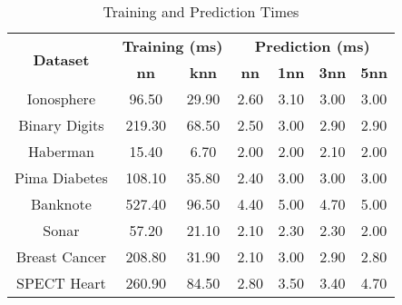 \begin{table}[htbp]
\caption{Training and Prediction Times}
\begin{center}
\begin{tabular}{|c|c|c|c|c|c|c|}
\hline
\multirow{2}{*}{\textbf{Dataset}} & \multicolumn{2}{c|}{\textbf{Training (ms)}} & \multicolumn{4}{c|}{\textbf{Prediction (ms)}} \\ \cline{2-7}
 & \textbf{nn} & \textbf{knn} & \textbf{nn} & \textbf{1nn} & \textbf{3nn} & \textbf{5nn} \\ \hline
Ionosphere & 96.50 & 29.90 & 2.60 & 3.10 & 3.00 & 3.00 \\ \hline
Binary Digits & 219.30 & 68.50 & 2.50 & 3.00 & 2.90 & 2.90 \\ \hline
Haberman & 15.40 & 6.70 & 2.00 & 2.00 & 2.10 & 2.00 \\ \hline
Pima Diabetes & 108.10 & 35.80 & 2.40 & 3.00 & 3.00 & 3.00 \\ \hline
Banknote & 527.40 & 96.50 & 4.40 & 5.00 & 4.70 & 5.00 \\ \hline
Sonar & 57.20 & 21.10 & 2.10 & 2.30 & 2.30 & 2.00 \\ \hline
Breast Cancer & 208.80 & 31.90 & 2.10 & 3.00 & 2.90 & 2.80 \\ \hline
SPECT Heart & 260.90 & 84.50 & 2.80 & 3.50 & 3.40 & 4.70 \\ \hline
\end{tabular}
\label{tab:timing}
\end{center}
\end{table}